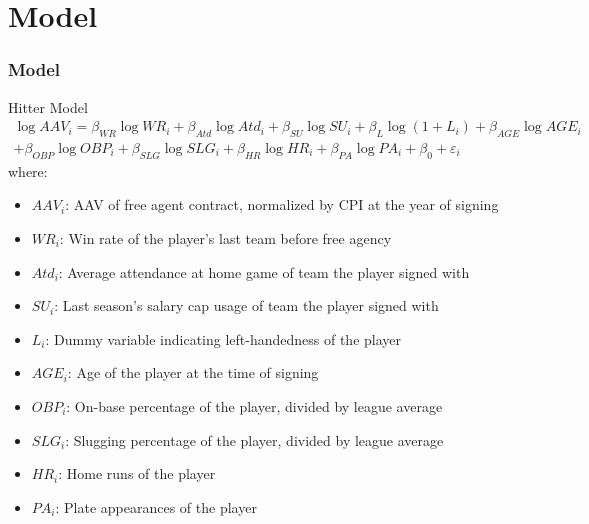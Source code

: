 \documentclass[9pt]{beamer}
\begin{document}
\section{Model}
\begin{frame}
    \frametitle{Model}
    \begin{block}{Hitter Model}
        \begin{multline}
            \log{AAV_{i}} = \beta_{WR} \log{WR_{i}}
                + \beta_{Atd} \log{Atd_{i}} 
                + \beta_{SU} \log{SU_{i}}
                + \beta_{L} \log{(1 + L_{i})}
                + \beta_{AGE}\log{AGE_{i}} \\
                + \beta_{OBP}\log{OBP_{i}}
                + \beta_{SLG}\log{SLG_{i}}
                + \beta_{HR}\log{HR_{i}}
                + \beta_{PA}\log{PA_{i}}
                + \beta_{0} 
                + \varepsilon_{i}
        \end{multline}
        where:
        \begin{itemize}
            \item $AAV_{i}$: AAV of free agent contract, normalized by CPI at the year of signing
            \item $WR_{i}$: Win rate of the player's last team before free agency
            \item $Atd_{i}$: Average attendance at home game of team the player signed with
            \item $SU_{i}$: Last season's salary cap usage of team the player signed with
            \item $L_{i}$: Dummy variable indicating left-handedness of the player
            \item $AGE_{i}$: Age of the player at the time of signing
            \item $OBP_{i}$: On-base percentage of the player, divided by league average
            \item $SLG_{i}$: Slugging percentage of the player, divided by league average
            \item $HR_{i}$: Home runs of the player
            \item $PA_{i}$: Plate appearances of the player
        \end{itemize}
    \end{block}
\end{frame}
\end{document}
